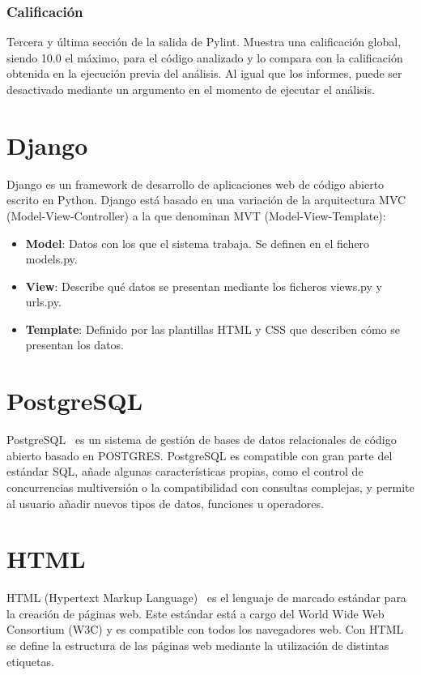\documentclass[a4paper, 12pt]{book}
\begin{document}
\subsubsection{Calificación}

Tercera y última sección de la salida de Pylint.
Muestra una calificación global, siendo 10.0 el máximo, para el código analizado y lo compara con la calificación obtenida en la ejecución previa del análisis.
Al igual que los informes, puede ser desactivado mediante un argumento en el momento de ejecutar el análisis.

\section{Django} 
\label{sec:django}
Django\cite{django} es un framework de desarrollo de aplicaciones web de código abierto escrito en Python. Django está basado en una variación de la arquitectura MVC (Model-View-Controller) a la que denominan MVT (Model-View-Template):
\begin{itemize}
	\item \textbf{Model}: Datos con los que el sistema trabaja. Se definen en el fichero models.py.
	\item \textbf{View}: Describe qué datos se presentan mediante los ficheros views.py y urls.py. 
	\item \textbf{Template}: Definido por las plantillas HTML y CSS que describen cómo se presentan los datos.
\end{itemize}

\section{PostgreSQL} 
\label{sec:postgresql}

PostgreSQL~\cite{postgresql} es un sistema de gestión de bases de datos relacionales de código abierto basado en POSTGRES. PostgreSQL es compatible con gran parte del estándar SQL, añade algunas características propias, como el control de concurrencias multiversión o la compatibilidad con consultas complejas, y permite al usuario añadir nuevos tipos de datos, funciones u operadores.

\section{HTML} 
\label{sec:html}

HTML (Hypertext Markup Language)~\cite{htmlcss} es el lenguaje de marcado estándar para la creación de páginas web. Este estándar está a cargo del World Wide Web Consortium (W3C) y es compatible con todos los navegadores web.
Con HTML se define la estructura de las páginas web mediante la utilización de distintas etiquetas.
\end{document}

